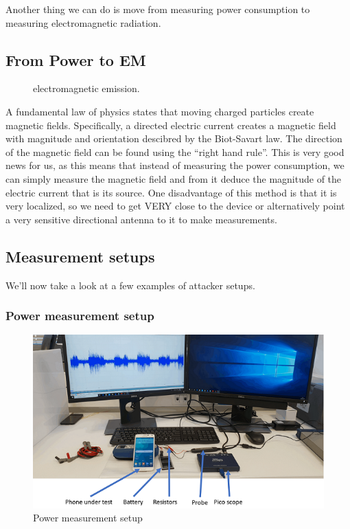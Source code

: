 Another thing we can do is move from measuring power consumption to measuring electromagnetic radiation.

\subsection {From Power to EM}

\begin{figure}[!ht]
    \centering
    
    \caption{electromagnetic emission.} \label{fig:electromagnetic emission}
\end{figure}

A fundamental law of physics states that moving charged particles create magnetic fields. Specifically, a directed electric current creates a magnetic field with magnitude and orientation descibred by the Biot-Savart law. The direction of the magnetic field can be found using the ``right hand rule''. This is very good news for us, as this means that instead of measuring the power consumption, we can simply measure the magnetic field and from it deduce the magnitude of the electric current that is its source.
One disadvantage of this method is that it is very localized, so we need to get VERY close to the device or alternatively point a very sensitive directional antenna to it to make measurements.

\subsection{Measurement setups}
We'll now take a look at a few examples of attacker setups.

\subsubsection{Power measurement setup}

\begin{figure}[!ht]
    \centering
    \includegraphics[width=1.0\linewidth]{images/chapter4/power_measurement_setup.png}
    \caption{Power measurement setup} \label{fig:power_measurement_setup}
\end{figure}

